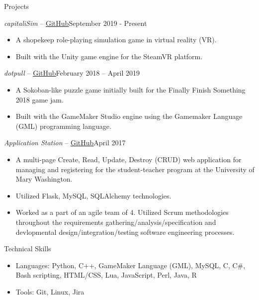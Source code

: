 \documentclass[]{mcdowellcv}
\begin{document}
	\begin{cvsection}{Projects}
		\begin{cvsubsection}{\textit{capitaliSim} -- \href{https://github.com/acarlyle/shopvr}{\underline{GitHub}}}{September 2019 - Present}	
			\begin{itemize}
				\item A shopekeep role-playing simulation game in virtual reality (VR).
				\item Built with the Unity game engine for the SteamVR platform.  
			\end{itemize}
		\end{cvsubsection}
		
		\begin{cvsubsection}{\textit{dotpull} -- \href{https://github.com/acarlyle/dotpull}{\underline{GitHub}}}{February 2018 -- April 2019}	
			\begin{itemize}
				\item A Sokoban-like puzzle game initially built for the Finally Finish Something 2018 game jam.  
				\item Built with the GameMaker Studio engine using the Gamemaker Language (GML) programming language.  
			\end{itemize}
		\end{cvsubsection}
		
		\begin{cvsubsection}{\textit{Application Station} -- \href{https://github.com/rhodochrosiite/InformationStation}{\underline{GitHub}}}{April 2017}		
			\begin{itemize}
				\item A multi-page Create, Read, Update, Destroy (CRUD) web application for managing and registering for the student-teacher program at the University of Mary Washington.  
				\item Utilized Flask, MySQL, SQLAlchemy technologies.
				\item Worked as a part of an agile team of 4.  Utilized Scrum methodologies throughout the requirements gathering/analysis/specification and devlopmental design/integration/testing software engineering processes.
			\end{itemize}
		\end{cvsubsection}
	\end{cvsection}
	
	\begin{cvsection}{Technical Skills}
		\begin{cvsubsection}{}{}{}	
			\begin{itemize}
				\item Languages: Python, C++, GameMaker Language (GML), MySQL, C, C\#, Bash scripting, HTML/CSS, Lua, JavaScript, Perl, Java, R 
				\item Tools: Git, Linux, Jira
			\end{itemize}
		\end{cvsubsection}
	\end{cvsection}
	
\end{document}
